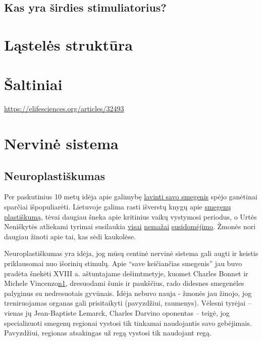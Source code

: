 \documentclass[]{book}
\begin{document}
\hypertarget{kas-yra-sirdies-stimuliatorius}{%
\section{Kas yra širdies stimuliatorius?}\label{kas-yra-sirdies-stimuliatorius}}

\hypertarget{lasteles-struktura}{%
\chapter{Ląstelės struktūra}\label{lasteles-struktura}}

\hypertarget{saltiniai-1}{%
\chapter{Šaltiniai}\label{saltiniai-1}}

\url{https://elifesciences.org/articles/32493}

\hypertarget{nervine-sistema}{%
\chapter{Nervinė sistema}\label{nervine-sistema}}

\hypertarget{neuroplastiskumas}{%
\section{Neuroplastiškumas}\label{neuroplastiskumas}}

Per paskutinius 10 metų idėja apie galimybę \href{https://trends.google.com/trends/explore?date=2004-05-20\%202019-06-20\&geo=US\&q=rewire\%20brain}{lavinti savo smegenis} spėjo ganėtinai sparčiai išpopuliarėti. Lietuvoje galima rasti išverstų knygų apie \href{https://kitosknygos.lt/knygos/Save-keiciancios-smegenys}{smegenų plastiškumą}, tėvai daugiau šneka apie kritinius vaikų vystymosi periodus, o Urtės Neniškytės atliekami tyrimai susilaukia \href{https://www.youtube.com/watch?v=WDF40W0QVn0}{visai} \href{https://www.youtube.com/watch?v=ezKhpOB7ZyE}{nemažai} \href{https://www.youtube.com/watch?v=9kXFrAyKs4U}{susidomėjimo}. Žmonės nori daugiau žinoti apie tai, kas sėdi kaukolėse.

Neuroplastiškumas yra idėja, jog mūsų centinė nervinė sistema gali augti ir keistis priklausomai nuo išorinių stimulų. Apie ``save keičiančias smegenis'' jau buvo pradėta šnekėti XVIII a. aštuntajame dešimtmetyje, kuomet Charles Bonnet ir Michele Vincenzo\href{Neuroplasticity,\%20MIT\%20Press}{n1}, dresuodami šunis ir paukščius, rado didesnes smegenėles palyginus su nedresuotais gyvūnais. Idėja nebuvo nauja - žmonės jau žinojo, jog treniruojamas organas gali prisitaikyti (pavyzdžiui, raumenys). Vėlesni tyrėjai -- vienas jų Jean-Baptiste Lemarck, Charles Darvino oponentas -- teigė, jog specializuoti smegenų regionai vystosi tik tinkamai naudojantis savo gebėjimais. Pavyzdžiui, regionas atsakingas už regą vystosi tik naudojant regą.
\end{document}
